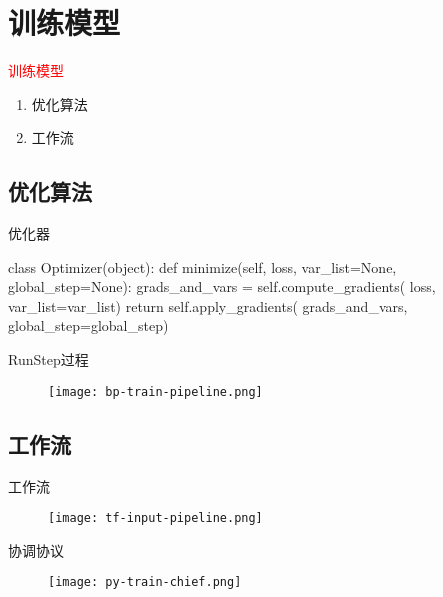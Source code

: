 \section{训练模型}
\label{sec:train-model}

\begin{frame}
  \begin{center}
    \Huge{\textcolor{red}{训练模型}}
  \end{center}

  \begin{enumerate}
    \item \alert{优化算法}
    \item \alert{工作流}
  \end{enumerate}    
\end{frame}

\subsection{优化算法}

\begin{frame}[fragile]{优化器}
  \begin{python} 
class Optimizer(object):
  def minimize(self, loss, var_list=None, global_step=None):
    grads_and_vars = self.compute_gradients(
      loss, var_list=var_list)
    return self.apply_gradients(
      grads_and_vars, 
      global_step=global_step)
  \end{python}
\end{frame}

\begin{frame}{RunStep过程}
  \begin{figure}
    \centering
    \texttt{[image: bp-train-pipeline.png]}
  \end{figure}
\end{frame}

\subsection{工作流}

\begin{frame}{工作流}
  \begin{figure}
    \centering
    \texttt{[image: tf-input-pipeline.png]}
  \end{figure}
\end{frame}

\begin{frame}{协调协议}
  \begin{figure}
    \centering
    \texttt{[image: py-train-chief.png]}
  \end{figure}
\end{frame}
